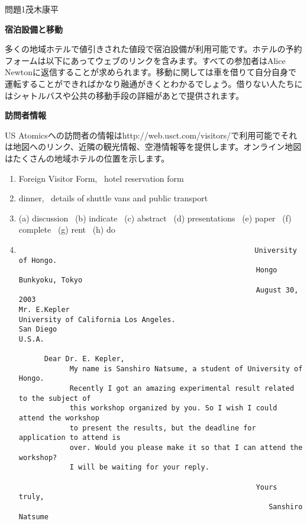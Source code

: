 \documentclass[fleqn]{jbook}
\begin{document}
\begin{answer}{問題1}{茂木康平}
{{\bf 宿泊設備と移動}

多くの地域ホテルで値引きされた値段で宿泊設備が利用可能です。ホテルの予約フォームは以下にあってウェブのリンクを含みます。すべての参加者はAlice Newtonに返信することが求められます。移動に関しては車を借りて自分自身で運転することができればかなり融通がきくとわかるでしょう。借りない人たちにはシャトルバスや公共の移動手段の詳細があとで提供されます。

{\bf 訪問者情報}

US Atomicsへの訪問者の情報はhttp://web.usct.com/visitors/で利用可能でそれは地図へのリンク、近隣の観光情報、空港情報等を提供します。オンライン地図はたくさんの地域ホテルの位置を示します。
}

\begin{enumerate}
    \item Foreign Visitor Form, \, hotel reservation form 

    \item  dinner, \, details of shuttle vans and public transport

    \item (a) discussion \, (b) indicate \, (c) abstract \, (d) presentations \, (e) paper \, (f) complete \, (g) rent \, (h) do


    \item
\begin{verbatim}
                              　                        University of Hongo.
                                                        Hongo Bunkyoku, Tokyo
                                                        August 30, 2003　　
Mr. E.Kepler
University of California Los Angeles.
San Diego
U.S.A.

      Dear Dr. E. Kepler,               
            My name is Sanshiro Natsume, a student of University of Hongo.
            Recently I got an amazing experimental result related to the subject of
            this workshop organized by you. So I wish I could attend the workshop 
            to present the results, but the deadline for application to attend is
            over. Would you please make it so that I can attend the workshop?
            I will be waiting for your reply.

                                                        Yours truly,
                                                           Sanshiro Natsume
	 \end{verbatim}




\end{enumerate}

\end{answer}
\end{document}
